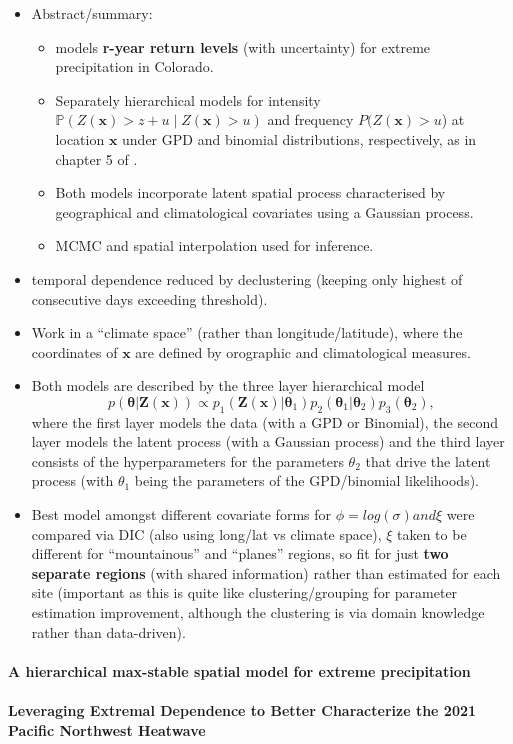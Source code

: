 \documentclass{article}
\numberwithin{equation}{section}
\begin{document}
\begin{itemize}
  \item Abstract/summary:
    \begin{itemize}
      \item \cite{Cooley2007} models \textbf{r-year return levels} (with uncertainty) for extreme precipitation in Colorado.
      \item Separately hierarchical models for intensity $\mathbb{P}(Z(\bm{x}) > z + u \mid Z(\bm{x}) > u)$ and frequency $P(Z(\bm{x}) > u$) at location $\bm{x}$ under GPD and binomial distributions, respectively, as in chapter 5 of \cite{Coles2001}. 
      \item Both models incorporate latent spatial process characterised by geographical and climatological covariates using a Gaussian process. 
      \item MCMC and spatial interpolation used for inference. 
    \end{itemize}
    \item temporal dependence reduced by declustering (keeping only highest of consecutive days exceeding threshold). 
    \item Work in a ``climate space'' (rather than longitude/latitude), where the coordinates of $\bm{x}$ are defined by orographic and climatological measures. 
    \item Both models are described by the three layer hierarchical model
      \[
        p(\bm{\theta} | \bm{Z}(\bm{x})) \propto p_1(\bm{Z}(\bm{x}) | \bm{\theta}_1) p_2(\bm{\theta}_1 | \bm{\theta}_2) p_3(\bm{\theta}_2),
      \]
      where the first layer models the data (with a GPD or Binomial), the second layer models the latent process (with a Gaussian process) and the third layer consists of the hyperparameters for the parameters $\theta_2$ that drive the latent process (with $\theta_1$ being the parameters of the GPD/binomial likelihoods). 
    \item Best model amongst different covariate forms for $\phi = log(\sigma) and \xi$ were compared via DIC (also using long/lat vs climate space), $\xi$ taken to be different for ``mountainous'' and ``planes'' regions, so fit for just \textbf{two separate regions} (with shared information) rather than estimated for each site (important as this is quite like clustering/grouping for parameter estimation improvement, although the clustering is via domain knowledge rather than data-driven). 
\end{itemize}

\paragraph{A hierarchical max-stable spatial model for extreme precipitation}

\paragraph{Leveraging Extremal Dependence to Better Characterize the 2021 Pacific Northwest Heatwave}
\cite{Zhang2024}



\end{document}
